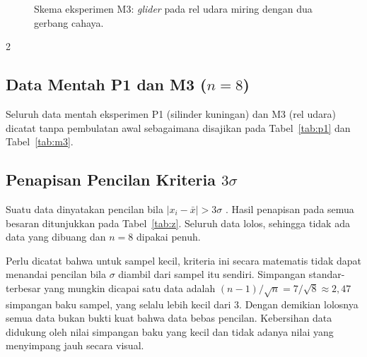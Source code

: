 \documentclass[a4paper, 12pt]{article}
\begin{document}
\begin{figure}[H]
\centering
{}
\caption{Skema eksperimen M3: \textit{glider} pada rel udara miring dengan dua gerbang cahaya.}
\label{fig:skema}
\end{figure}

\begin{multicols}{2}
    \raggedcolumns
        \subsection{Data Mentah P1 dan M3 (\texorpdfstring{$n=8$}{n=8})}
        Seluruh data mentah eksperimen P1 (silinder kuningan) dan M3 (rel udara) dicatat tanpa pembulatan awal sebagaimana disajikan pada Tabel~\ref{tab:p1} dan Tabel~\ref{tab:m3}.

        \subsection{Penapisan Pencilan Kriteria \texorpdfstring{$3\sigma$}{3 sigma}}
        Suatu data dinyatakan pencilan bila $|x_i-\bar{x}|>3\sigma$ \parencite{Taylor1997}. Hasil penapisan pada semua besaran ditunjukkan pada Tabel~\ref{tab:z}. Seluruh data lolos, sehingga tidak ada data yang dibuang dan $n=8$ dipakai penuh.

        Perlu dicatat bahwa untuk sampel kecil, kriteria ini secara matematis tidak dapat menandai pencilan bila $\sigma$ diambil dari sampel itu sendiri. Simpangan standar-terbesar yang mungkin dicapai satu data adalah $(n-1)/\sqrt{n}=7/\sqrt{8}\approx 2{,}47$ simpangan baku sampel, yang selalu lebih kecil dari $3$. Dengan demikian lolosnya semua data bukan bukti kuat bahwa data bebas pencilan. Kebersihan data didukung oleh nilai simpangan baku yang kecil dan tidak adanya nilai yang menyimpang jauh secara visual.
\end{multicols}
\end{document}
